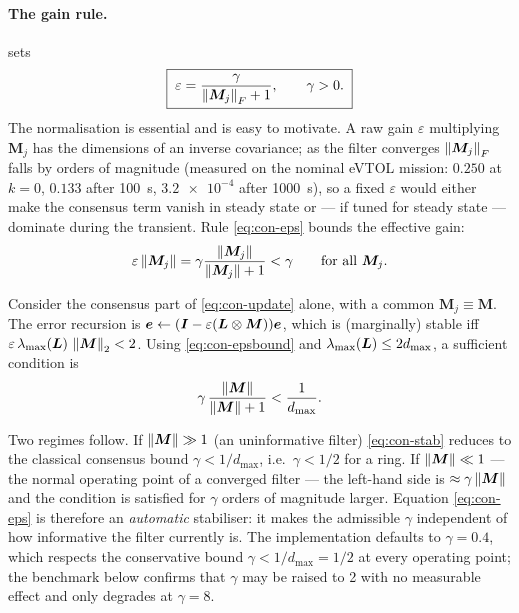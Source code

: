 \paragraph{The gain rule.} \cite[Alg.~2]{olfatisaber2007dkf} sets
\begin{equation}
\boxed{\;\varepsilon = \frac{\gamma}{\left\lVert \bm{M}_j \right\rVert_F + 1},\qquad \gamma>0 .\;}
\label{eq:con-eps}
\end{equation}
The normalisation is essential and is easy to motivate. A raw gain $\varepsilon$ multiplying
$\bm{M}_j$ has the dimensions of an inverse covariance; as the filter converges
$\left\lVert \bm{M}_j \right\rVert_F$ falls by orders of magnitude (measured on the nominal eVTOL mission:
$\num{0.250}$ at $k=0$, $\num{0.133}$ after \SI{100}{\second}, $\num{3.2e-4}$ after
\SI{1000}{\second}), so a fixed $\varepsilon$ would either make the consensus term vanish in
steady state or --- if tuned for steady state --- dominate during the transient. Rule
\eqref{eq:con-eps} bounds the effective gain:
\begin{equation}
\varepsilon\left\lVert \bm{M}_j \right\rVert = \gamma\frac{\left\lVert \bm{M}_j \right\rVert}{\left\lVert \bm{M}_j \right\rVert+1} < \gamma
\qquad \text{for all } \bm{M}_j .
\label{eq:con-epsbound}
\end{equation}

\begin{proposition}\label{prop:con-stab}
Consider the consensus part of \eqref{eq:con-update} alone, with a common
$\bm{M}_j\equiv\bm{M}$. The error recursion is $\bm{e}\leftarrow(\bm{I} - \varepsilon(\bm{L}\otimes\bm{M}))\bm{e}$,
which is (marginally) stable iff $\varepsilon\,\lambda_{\max}(\bm{L})\,\left\lVert \bm{M} \right\rVert_2 < 2$. Using
\eqref{eq:con-epsbound} and $\lambda_{\max}(\bm{L})\le 2d_{\max}$, a sufficient condition is
\begin{equation}
\gamma\,\frac{\left\lVert \bm{M} \right\rVert}{\left\lVert \bm{M} \right\rVert+1} < \frac{1}{d_{\max}} .
\label{eq:con-stab}
\end{equation}
\end{proposition}
Two regimes follow. If $\left\lVert \bm{M} \right\rVert\gg1$ (an uninformative filter) \eqref{eq:con-stab} reduces
to the classical consensus bound $\gamma<1/d_{\max}$, i.e.\ $\gamma<1/2$ for a ring. If
$\left\lVert \bm{M} \right\rVert\ll1$ --- the normal operating point of a converged filter --- the left-hand side is
$\approx\gamma\left\lVert \bm{M} \right\rVert$ and the condition is satisfied for $\gamma$ orders of magnitude
larger. Equation \eqref{eq:con-eps} is therefore an \emph{automatic} stabiliser: it makes the
admissible $\gamma$ independent of how informative the filter currently is. The implementation
defaults to $\gamma=\num{0.4}$, which respects the conservative bound $\gamma<1/d_{\max}=1/2$ at
every operating point; the benchmark below confirms that $\gamma$ may be raised to \num{2} with no
measurable effect and only degrades at $\gamma=\num{8}$.

